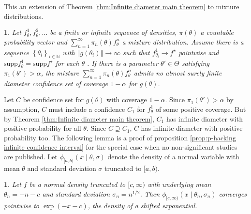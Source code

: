 \documentclass{article}
\makeatletter
\theoremstyle{plain}
\theoremstyle{plain}
\newtheorem{lem}{\protect\lemmaname}
\theoremstyle{definition}
\theoremstyle{remark}
\theoremstyle{definition}
\theoremstyle{plain}
\theoremstyle{plain}
\newtheorem{prop}[thm]{\protect\propositionname}
\theoremstyle{definition}
\newenvironment{proof}[1][\protect\proofname]{\par
	\normalfont\topsep6\p@\@plus6\p@\relax
	\trivlist
	\itemindent\parindent
	\item[\hskip\labelsep\scshape #1]\ignorespaces
}{%
	\endtrivlist\@endpefalse
}
\providecommand{\proofname}{Proof}
\providecommand{\propositionname}{Proposition}
\providecommand{\lemmaname}{Lemma}
\makeatother
\begin{document}
This an extension of Theorem \ref{thm:Infinite diameter main theorem}
to mixture distributions.
\begin{prop}
\label{cor:Mixture model corollary}Let $f_{\theta}^{1},f_{\theta}^{2},\ldots$
be a finite or infinite sequence of densities, $\pi(\theta)$
a countable probability vector and $\sum_{n=1}^{\infty}\pi_{n}(\theta)f_{\theta}^{n}$
a mixture distribution. Assume there is a sequence $\left\{ \theta_{i}\right\} _{i\in\mathbb{N}}$
with $\left\Vert g(\theta_{i})\right\Vert \to\infty$ such
that $f_{\theta_{i}}^{1}\to f^{\star}$ pointwise and $\textrm{supp}f_{\theta}^{1} = \textrm{supp}f^{\star}$
for each $\theta$ . If there is a parameter $\theta'\in\Theta$ satisfying
$\pi_{1}(\theta')>\alpha$, the mixture $\sum_{n=1}^{\infty}\pi_{n}(\theta)f_{\theta}^{n}$
admits no almost surely finite diameter confidence set of coverage
$1-\alpha$ for $g(\theta)$.
\end{prop}

\begin{proof}
Let $C$ be confidence set for $g(\theta)$ with coverage
$1-\alpha$. Since $\pi_{1}(\theta')>\alpha$ by assumption,
$C$ must include a confidence $C_{1}$ for $f_{\theta}^{1}$ of some
positive coverage. But by Theorem \ref{thm:Infinite diameter main theorem},
$C_{1}$ has infinite diameter with positive probability for all $\theta$.
Since $C\supseteq C_{1}$, $C$ has infinite diameter with positive
probability too.
\end{proof}
The following lemma is a proof of proposition \ref{prop:p-hacking infinite confidence interval}
for the special case when no non-significant studies are published.
Let $\phi_{[a,b)}(x\mid\theta,\sigma)$ denote
the density of a normal variable with mean $\theta$ and standard
deviation $\sigma$ truncated to $[a,b)$.
\begin{lem}
\label{lem:One-sided normal limit}Let $f$ be a normal density truncated
to $[c,\infty)$ with underlying mean $\theta_{n}=-n-c$
and standard deviation $\sigma_{n}=n^{1/2}$. Then $\phi_{[c,\infty)}(x\mid\theta_{n},\sigma_{n})$
converges pointwise to $\exp(-x-c)$, the density of a
shifted exponential.
\end{lem}
\end{document}
